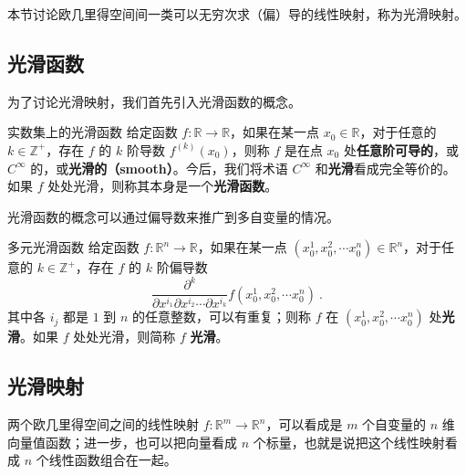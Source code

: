 


本节讨论欧几里得空间间一类可以无穷次求（偏）导的线性映射，称为光滑映射。

\subsection{光滑函数}

为了讨论光滑映射，我们首先引入光滑函数的概念。

\begin{definition}{实数集上的光滑函数}
给定函数 $f:\mathbb{R}\rightarrow\mathbb{R}$，如果在某一点 $x_0\in\mathbb{R}$，对于任意的 $k\in\mathbb{Z}^+$，存在 $f$ 的 $k$ 阶导数 $f^{(k)}(x_0)$，则称 $f$ 是在点 $x_0$ 处\textbf{任意阶可导的}，或 $C^\infty$ 的，或\textbf{光滑的（smooth）}。今后，我们将术语 $C^{\infty}$ 和\textbf{光滑}看成完全等价的。如果 $f$ 处处光滑，则称其本身是一个\textbf{光滑函数}。
\end{definition}

光滑函数的概念可以通过偏导数来推广到多自变量的情况。

\begin{definition}{多元光滑函数}
给定函数 $f:\mathbb{R}^n\rightarrow\mathbb{R}$，如果在某一点 $(x_0^1, x_0^2, \cdots x_0^n) \in\mathbb{R}^n$，对于任意的 $k\in\mathbb{Z}^+$，存在 $f$ 的 $k$ 阶偏导数$$\frac{\partial^k}{\partial x^{i_1}\partial x^{i_2}\cdots\partial x^{i_k}}f(x_0^1, x_0^2, \cdots x_0^n)~.$$其中各 $i_j$ 都是 $1$ 到 $n$ 的任意整数，可以有重复；则称 $f$ 在 $(x_0^1, x_0^2, \cdots x_0^n)$ 处\textbf{光滑}。如果 $f$ 处处光滑，则简称 $f$ \textbf{光滑}。
\end{definition}

\subsection{光滑映射}

两个欧几里得空间之间的线性映射 $f:\mathbb{R}^m\rightarrow \mathbb{R}^n$，可以看成是 $m$ 个自变量的 $n$ 维向量值函数；进一步，也可以把向量看成 $n$ 个标量，也就是说把这个线性映射看成 $n$ 个线性函数组合在一起。

